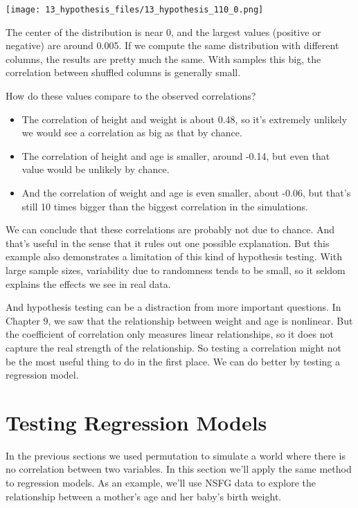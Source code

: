 \begin{center}
\texttt{[image: 13\_hypothesis\_files/13\_hypothesis\_110\_0.png]}
\end{center}

The center of the distribution is near 0, and the largest values
(positive or negative) are around 0.005. If we compute the same
distribution with different columns, the results are pretty much the
same. With samples this big, the correlation between shuffled columns is
generally small.

How do these values compare to the observed correlations?

\begin{itemize}
\item
  The correlation of height and weight is about 0.48, so it's extremely
  unlikely we would see a correlation as big as that by chance.
\item
  The correlation of height and age is smaller, around -0.14, but even
  that value would be unlikely by chance.
\item
  And the correlation of weight and age is even smaller, about -0.06,
  but that's still 10 times bigger than the biggest correlation in the
  simulations.
\end{itemize}

We can conclude that these correlations are probably not due to chance.
And that's useful in the sense that it rules out one possible
explanation. But this example also demonstrates a limitation of this
kind of hypothesis testing. With large sample sizes, variability due to
randomness tends to be small, so it seldom explains the effects we see
in real data.

And hypothesis testing can be a distraction from more important
questions. In Chapter 9, we saw that the relationship between weight and
age is nonlinear. But the coefficient of correlation only measures
linear relationships, so it does not capture the real strength of the
relationship. So testing a correlation might not be the most useful
thing to do in the first place. We can do better by testing a regression
model.

\section{Testing Regression Models}\label{testing-regression-models}

In the previous sections we used permutation to simulate a world where
there is no correlation between two variables. In this section we'll
apply the same method to regression models. As an example, we'll use
NSFG data to explore the relationship between a mother's age and her
baby's birth weight.

